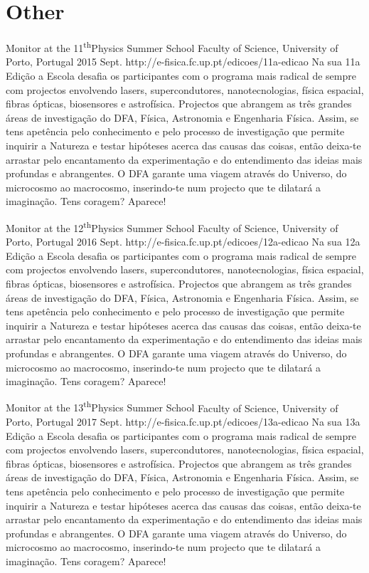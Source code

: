 \section{Other}

{Monitor at the 11\textsuperscript{th}Physics Summer School}
{Faculty of Science, University of Porto, Portugal}%
{2015 Sept.}%
{http://e-fisica.fc.up.pt/edicoes/11a-edicao}%
{}%
{Na sua 11a Edição a Escola desafia os participantes com o programa mais radical de sempre com projectos envolvendo lasers, supercondutores, nanotecnologias, física espacial, fibras ópticas, biosensores e astrofísica. Projectos que abrangem as três grandes áreas de investigação do DFA, Física, Astronomia e Engenharia Física. Assim, se tens apetência pelo conhecimento e pelo processo de investigação que permite inquirir a Natureza e testar hipóteses acerca das causas das coisas, então deixa-te arrastar pelo encantamento da experimentação e do entendimento das ideias mais profundas e abrangentes. O DFA garante uma viagem através do Universo, do microcosmo ao macrocosmo, inserindo-te num projecto que te dilatará a imaginação. Tens coragem? Aparece!}%


{Monitor at the 12\textsuperscript{th}Physics Summer School}
{Faculty of Science, University of Porto, Portugal}%
{2016 Sept.}%
{http://e-fisica.fc.up.pt/edicoes/12a-edicao}%
{}%
{Na sua 12a Edição a Escola desafia os participantes com o programa mais radical de sempre com projectos envolvendo lasers, supercondutores, nanotecnologias, física espacial, fibras ópticas, biosensores e astrofísica. Projectos que abrangem as três grandes áreas de investigação do DFA, Física, Astronomia e Engenharia Física. Assim, se tens apetência pelo conhecimento e pelo processo de investigação que permite inquirir a Natureza e testar hipóteses acerca das causas das coisas, então deixa-te arrastar pelo encantamento da experimentação e do entendimento das ideias mais profundas e abrangentes. O DFA garante uma viagem através do Universo, do microcosmo ao macrocosmo, inserindo-te num projecto que te dilatará a imaginação. Tens coragem? Aparece!}%


{Monitor at the 13\textsuperscript{th}Physics Summer School}
{Faculty of Science, University of Porto, Portugal}%
{2017 Sept.}%
{http://e-fisica.fc.up.pt/edicoes/13a-edicao}%
{}%
{Na sua 13a Edição a Escola desafia os participantes com o programa mais radical de sempre com projectos envolvendo lasers, supercondutores, nanotecnologias, física espacial, fibras ópticas, biosensores e astrofísica. Projectos que abrangem as três grandes áreas de investigação do DFA, Física, Astronomia e Engenharia Física. Assim, se tens apetência pelo conhecimento e pelo processo de investigação que permite inquirir a Natureza e testar hipóteses acerca das causas das coisas, então deixa-te arrastar pelo encantamento da experimentação e do entendimento das ideias mais profundas e abrangentes. O DFA garante uma viagem através do Universo, do microcosmo ao macrocosmo, inserindo-te num projecto que te dilatará a imaginação. Tens coragem? Aparece!}%



